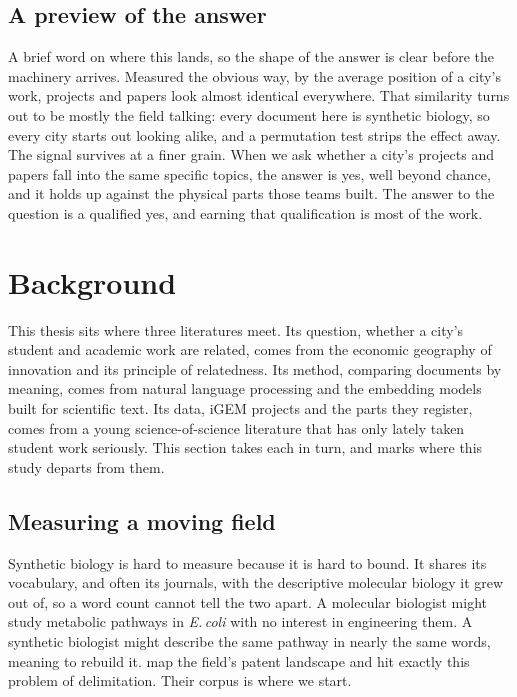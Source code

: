 \documentclass[12pt,a4paper]{article}
\begin{document}
	\subsection{A preview of the answer}
	
	A brief word on where this lands, so the shape of the answer is clear before the
	machinery arrives. Measured the obvious way, by the average position of a city's
	work, projects and papers look almost identical everywhere. That similarity turns
	out to be mostly the field talking: every document here is synthetic biology, so
	every city starts out looking alike, and a permutation test strips the effect
	away. The signal survives at a finer grain. When we ask whether a city's projects
	and papers fall into the same specific topics, the answer is yes, well beyond
	chance, and it holds up against the physical parts those teams built. The answer
	to the question is a qualified yes, and earning that qualification is most of the
	work.
	
	\section{Background}
	
	This thesis sits where three literatures meet. Its question, whether a city's
	student and academic work are related, comes from the economic geography of
	innovation and its principle of relatedness. Its method, comparing documents by
	meaning, comes from natural language processing and the embedding models built for
	scientific text. Its data, iGEM projects and the parts they register, comes from a
	young science-of-science literature that has only lately taken student work
	seriously. This section takes each in turn, and marks where this study departs from
	them.
	
	\subsection{Measuring a moving field}
	
	Synthetic biology is hard to measure because it is hard to bound. It shares its
	vocabulary, and often its journals, with the descriptive molecular biology it grew
	out of, so a word count cannot tell the two apart. A molecular biologist might
	study metabolic pathways in \textit{E.\,coli} with no interest in engineering
	them. A synthetic biologist might describe the same pathway in nearly the same
	words, meaning to rebuild it. \citet{oldhamSyntheticBiologyMapping2018} map the
	field's patent landscape and hit exactly this problem of delimitation. Their
	corpus is where we start.
	
\end{document}
